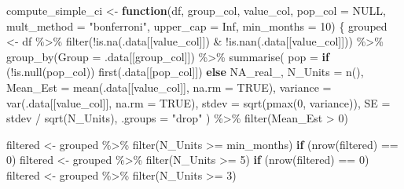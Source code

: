 \documentclass[
  letterpaper,
  DIV=11,
  numbers=noendperiod]{scrartcl}
\newenvironment{Shaded}{\begin{snugshade}}{\end{snugshade}}
\newcommand{\AttributeTok}[1]{\textcolor[rgb]{0.40,0.45,0.13}{#1}}
\newcommand{\ConstantTok}[1]{\textcolor[rgb]{0.56,0.35,0.01}{#1}}
\newcommand{\ControlFlowTok}[1]{\textcolor[rgb]{0.00,0.23,0.31}{\textbf{#1}}}
\newcommand{\DecValTok}[1]{\textcolor[rgb]{0.68,0.00,0.00}{#1}}
\newcommand{\FunctionTok}[1]{\textcolor[rgb]{0.28,0.35,0.67}{#1}}
\newcommand{\NormalTok}[1]{\textcolor[rgb]{0.00,0.23,0.31}{#1}}
\newcommand{\OtherTok}[1]{\textcolor[rgb]{0.00,0.23,0.31}{#1}}
\newcommand{\SpecialCharTok}[1]{\textcolor[rgb]{0.37,0.37,0.37}{#1}}
\newcommand{\StringTok}[1]{\textcolor[rgb]{0.13,0.47,0.30}{#1}}
\begin{document}
\begin{Shaded}
\begin{Highlighting}[]
\NormalTok{compute\_simple\_ci }\OtherTok{\textless{}{-}} \ControlFlowTok{function}\NormalTok{(df, group\_col, value\_col, }\AttributeTok{pop\_col =} \ConstantTok{NULL}\NormalTok{,}
                              \AttributeTok{mult\_method =} \StringTok{"bonferroni"}\NormalTok{, }\AttributeTok{upper\_cap =} \ConstantTok{Inf}\NormalTok{,}
                              \AttributeTok{min\_months =} \DecValTok{10}\NormalTok{) \{}
\NormalTok{  grouped }\OtherTok{\textless{}{-}}\NormalTok{ df }\SpecialCharTok{\%\textgreater{}\%}
    \FunctionTok{filter}\NormalTok{(}\SpecialCharTok{!}\FunctionTok{is.na}\NormalTok{(.data[[value\_col]]) }\SpecialCharTok{\&} \SpecialCharTok{!}\FunctionTok{is.nan}\NormalTok{(.data[[value\_col]])) }\SpecialCharTok{\%\textgreater{}\%}
    \FunctionTok{group\_by}\NormalTok{(}\AttributeTok{Group =}\NormalTok{ .data[[group\_col]]) }\SpecialCharTok{\%\textgreater{}\%}
    \FunctionTok{summarise}\NormalTok{(}
      \AttributeTok{pop      =} \ControlFlowTok{if}\NormalTok{ (}\SpecialCharTok{!}\FunctionTok{is.null}\NormalTok{(pop\_col)) }\FunctionTok{first}\NormalTok{(.data[[pop\_col]]) }\ControlFlowTok{else} \ConstantTok{NA\_real\_}\NormalTok{,}
      \AttributeTok{N\_Units  =} \FunctionTok{n}\NormalTok{(),}
      \AttributeTok{Mean\_Est =} \FunctionTok{mean}\NormalTok{(.data[[value\_col]], }\AttributeTok{na.rm =} \ConstantTok{TRUE}\NormalTok{),}
      \AttributeTok{variance =} \FunctionTok{var}\NormalTok{(.data[[value\_col]], }\AttributeTok{na.rm =} \ConstantTok{TRUE}\NormalTok{),}
      \AttributeTok{stdev    =} \FunctionTok{sqrt}\NormalTok{(}\FunctionTok{pmax}\NormalTok{(}\DecValTok{0}\NormalTok{, variance)),}
      \AttributeTok{SE       =}\NormalTok{ stdev }\SpecialCharTok{/} \FunctionTok{sqrt}\NormalTok{(N\_Units),}
      \AttributeTok{.groups  =} \StringTok{"drop"}
\NormalTok{    ) }\SpecialCharTok{\%\textgreater{}\%}
    \FunctionTok{filter}\NormalTok{(Mean\_Est }\SpecialCharTok{\textgreater{}} \DecValTok{0}\NormalTok{)}

\NormalTok{  filtered }\OtherTok{\textless{}{-}}\NormalTok{ grouped }\SpecialCharTok{\%\textgreater{}\%} \FunctionTok{filter}\NormalTok{(N\_Units }\SpecialCharTok{\textgreater{}=}\NormalTok{ min\_months)}
  \ControlFlowTok{if}\NormalTok{ (}\FunctionTok{nrow}\NormalTok{(filtered) }\SpecialCharTok{==} \DecValTok{0}\NormalTok{) filtered }\OtherTok{\textless{}{-}}\NormalTok{ grouped }\SpecialCharTok{\%\textgreater{}\%} \FunctionTok{filter}\NormalTok{(N\_Units }\SpecialCharTok{\textgreater{}=} \DecValTok{5}\NormalTok{)}
  \ControlFlowTok{if}\NormalTok{ (}\FunctionTok{nrow}\NormalTok{(filtered) }\SpecialCharTok{==} \DecValTok{0}\NormalTok{) filtered }\OtherTok{\textless{}{-}}\NormalTok{ grouped }\SpecialCharTok{\%\textgreater{}\%} \FunctionTok{filter}\NormalTok{(N\_Units }\SpecialCharTok{\textgreater{}=} \DecValTok{3}\NormalTok{)}


\end{Highlighting}
\end{Shaded}
\end{document}
